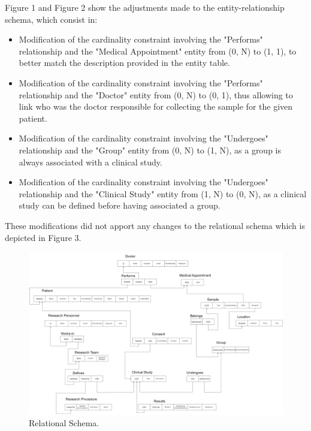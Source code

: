 Figure 1 and Figure 2 show the adjustments made to the entity-relationship schema, which consist in:
 \begin{itemize}
     \item Modification of the cardinality constraint involving the "Performs" relationship and the "Medical Appointment" entity from (0, N) to (1, 1), to better match the description provided in the entity table.
     \item Modification of the cardinality constraint involving the "Performs" relationship and the "Doctor" entity from (0, N) to (0, 1), thus allowing to link who was the doctor responsible for collecting the sample for the given patient.
     \item Modification of the cardinality constraint involving the "Undergoes" relationship and the "Group" entity from (0, N) to (1, N), as a group is always associated with a clinical study.
     \item Modification of the cardinality constraint involving the "Undergoes" relationship and the "Clinical Study" entity from (1, N) to (0, N), as a clinical study can be defined before having associated a group.
 \end{itemize}

 These modifications did not apport any changes to the relational schema which is depicted in Figure 3.
 \begin{center}
\begin{figure}[htp!]
    \centering
    \includegraphics[width=\textwidth]{schemas/RelationalSchema.png}
    \caption{Relational Schema.}
\end{figure}
\end{center}

\newpage
